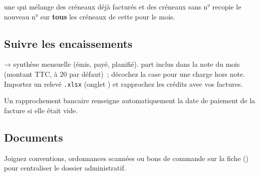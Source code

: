 \begin{avertissement}
   une \seance{} qui mélange des créneaux déjà facturés et des créneaux sans n° recopie le nouveau n° sur \textbf{tous} les créneaux de cette \seance{} pour le mois.
\end{avertissement}

\subsection{Suivre les encaissements}

\begin{workflowstep}[Trésorerie]
   → synthèse mensuelle (émis, payé, planifié).  part inclus dans la note du mois (montant TTC,  à 20 par défaut)~; décochez la case pour une charge hors note. Importez un relevé \texttt{.xlsx} (onglet ) et rapprochez les crédits avec vos factures.
\end{workflowstep}


Un rapprochement bancaire renseigne automatiquement la date de paiement de la facture si elle était vide.

\subsection{Documents}

Joignez conventions, ordonnances scannées ou bons de commande sur la fiche \structure{} () pour centraliser le dossier administratif.
